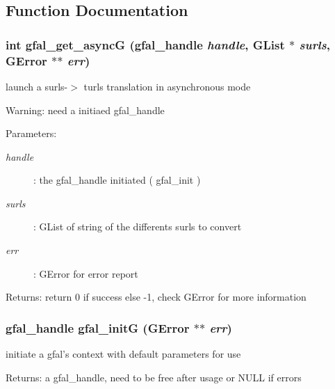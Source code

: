 \subsection{Function Documentation}
\subsubsection{\setlength{\rightskip}{0pt plus 5cm}int gfal\_\-get\_\-async\-G (gfal\_\-handle {\em handle}, GList $\ast$ {\em surls}, GError $\ast$$\ast$ {\em err})}\label{gfal__common__srm_8h_95ffd4de24c18af334c1d9c270de7d81}


launch a surls-$>$ turls translation in asynchronous mode 

\begin{Desc}
\item[Warning:]need a initiaed gfal\_\-handle \end{Desc}
\begin{Desc}
\item[Parameters:]
\begin{description}
\item[{\em handle}]: the gfal\_\-handle initiated ( gfal\_\-init ) \item[{\em surls}]: GList of string of the differents surls to convert \item[{\em err}]: GError for error report \end{description}
\end{Desc}
\begin{Desc}
\item[Returns:]return 0 if success else -1, check GError for more information \end{Desc}
\subsubsection{\setlength{\rightskip}{0pt plus 5cm}gfal\_\-handle gfal\_\-init\-G (GError $\ast$$\ast$ {\em err})}\label{gfal__common__srm_8h_8410ba458f920d8f8a8f0e5594170fe4}


initiate a gfal's context with default parameters for use \begin{Desc}
\item[Returns:]a gfal\_\-handle, need to be free after usage or NULL if errors \end{Desc}
